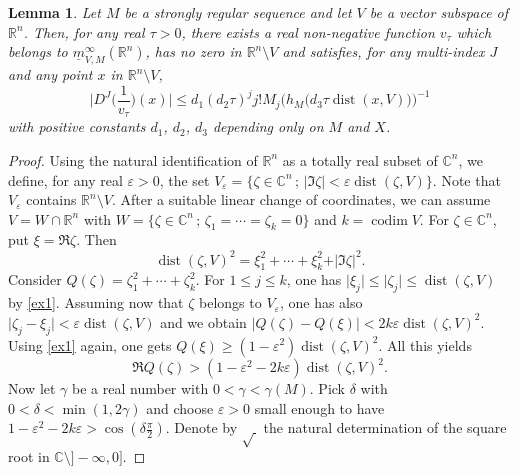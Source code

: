 \documentclass[a4paper]{amsart}
\theoremstyle{plain}
\newtheorem{lem}[subsubsection]{Lemma}
\theoremstyle{definition}
\theoremstyle{remark}
\DeclareMathOperator{\dist}{dist}
\DeclareMathOperator{\codim}{codim}
\newcommand{\imax}{\underline{m}}
\begin{document}
\begin{lem}\label{flatuplo2}
Let $ M $ be a strongly regular sequence and let $ V $ be a vector subspace of
$ \mathbb{R}^n $.
Then, for any real $ \tau>0 $, there exists 
a real non-negative function
$ v_\tau $ which belongs to $ \imax^\infty_{V,M}(\mathbb{R}^n) $, has
no zero in $ \mathbb{R}^n\setminus V $ and satisfies, for any multi-index
$ J $ and any point $ x $ in $ \mathbb{R}^n\setminus V $, 
\begin{equation}\label{flatlo2}
\Big\vert D^J\Big(\frac{1}{v_\tau}\Big)(x)\Big\vert \leq d_1(d_2\tau)^j j!M_j
\big(h_M\big(d_3\tau \dist(x,V)\big)\big)^{-1}
\end{equation}
with positive constants $ d_1 $, $ d_2 $, $ d_3 $ depending only on $ M $ and $ X $.
\end{lem}
\begin{proof} Using the natural identification
of $ \mathbb{R}^n $ as a totally real subset
of $ \mathbb{C}^n $, we define, for any real $ \varepsilon>0 $, the set
$ V_\varepsilon=\{\zeta\in\mathbb{C}^n\, ;\, \vert\Im\zeta\vert<\varepsilon \dist(\zeta,V)\} $. Note that $ V_\varepsilon $ contains $ \mathbb{R}^n\setminus V $.
After a suitable linear change of coordinates, we can
assume $ V=W\cap\mathbb{R}^n $ with 
$ W=\{\zeta\in\mathbb{C}^n\, ;\, \zeta_1=\cdots=\zeta_k=0\} $ and $ k=\codim V $. For
$ \zeta\in\mathbb{C}^n $, put
$ \xi=\Re\zeta $. Then 
\begin{equation}\label{ex1}
\dist(\zeta,V)^2=\xi_1^2+\cdots+\xi_k^2+\vert\Im\zeta\vert^2. 
\end{equation}
Consider $ Q(\zeta)=\zeta_1^2+\cdots+\zeta_k^2 $. For $ 1\leq j\leq k $, one
has $ \vert\xi_j\vert\leq\vert\zeta_j\vert\leq \dist(\zeta,V) $ by \eqref{ex1}. Assuming
now that
$ \zeta $ belongs to $ V_\varepsilon $, one has also $ \vert\zeta_j-\xi_j\vert<\varepsilon \dist(\zeta,V) $ and we obtain $ \vert Q(\zeta)-Q(\xi)\vert< 2k\varepsilon \dist(\zeta,V)^2 $. Using \eqref{ex1} again, one gets
$ Q(\xi)\geq (1-\varepsilon^2)\dist(\zeta,V)^2 $. All this yields
\begin{equation}\label{realpart}
\Re Q(\zeta)>(1-\varepsilon^2-2k\varepsilon)\dist(\zeta,V)^2.
\end{equation}
Now let $ \gamma $ be a real number with $ 0<\gamma<\gamma(M) $.
Pick $ \delta $ with $ 0<\delta<\min(1,2\gamma) $ and choose $ \varepsilon>0 $ 
small enough
to have $ 1-\varepsilon^2-2k\varepsilon>\cos(\delta\frac{\pi}{2}) $.
Denote by $ \sqrt{\, } $ the natural
determination of the square root in $ \mathbb{C}\setminus ]-\infty,0] $.

\end{proof}
\end{document}
